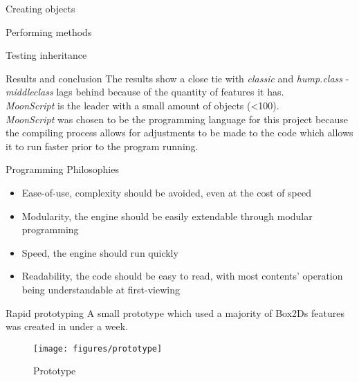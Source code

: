 \documentclass{beamer}
\begin{document}

\begin{frame}{Creating objects}
  
\end{frame}
\begin{frame}{Performing methods}
  
\end{frame}
\begin{frame}{Testing inheritance}
  
\end{frame}


\begin{frame}{Results and conclusion}
The results show a close tie with \textit{classic} and \textit{hump.class }- \textit{middleclass} lags behind because of the quantity of features it has. \\

\textit{MoonScript} is the leader with a small amount of objects (<100). \\

\textit{MoonScript} was chosen to be the programming language for this project because the compiling process allows for adjustments to be made to the code which allows it to run faster prior to the program running.
\end{frame}


\begin{frame}{Programming Philosophies}
  \begin{itemize}
    \item Ease-of-use, complexity should be avoided, even at the cost of speed
    \item Modularity, the engine should be easily extendable through modular programming
    \item Speed, the engine should run quickly
    \item Readability, the code should be easy to read, with most contents' operation being understandable at first-viewing
  \end{itemize}
\end{frame}

\begin{frame}{Rapid prototyping}
  A small prototype which used a majority of Box2Ds features was created in under a week.
    
  \begin{figure}
  \texttt{[image: figures/prototype]}
  \caption{Prototype}
  \end{figure}

\end{frame}
\end{document}
